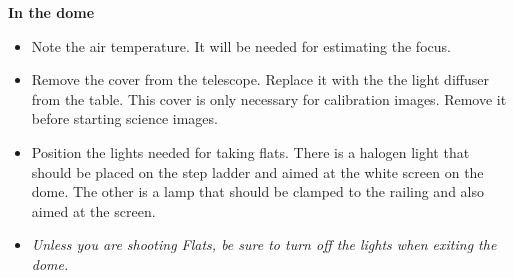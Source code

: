 \documentclass[letterpaper, 12pt]{report}
\begin{document}
{\large\textbf{In the dome}}
\begin{itemize}
	\item Note the air temperature. It will be needed for estimating the focus.
	\item Remove the cover from the telescope. Replace it with the the light diffuser from the table. This cover is only necessary for calibration images. Remove it before starting science images.
	\item Position the lights needed for taking flats. There is a halogen light that should be placed on the step ladder and aimed at the white screen on the dome. The other is a lamp that should be clamped to the railing and also aimed at the screen.
	\item \emph{Unless you are shooting Flats, be sure to turn off the lights when exiting the dome.}
\end{itemize}
\end{document}
